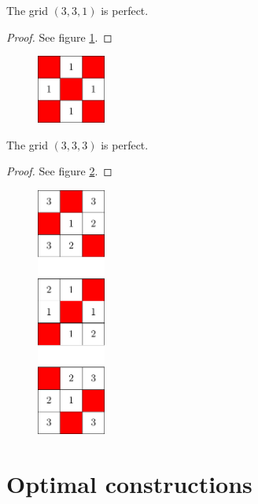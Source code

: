 \begin{con}
\label{con:3x3x1}
The grid $(3,3,1)$ is perfect.
\end{con}

\begin{proof}
See figure \ref{fig:3x3x1_numbered_heatmap}.
\end{proof}

\begin{figure}[]
\centering
\includegraphics[width=0.2\textwidth]{figures/A/3x3x1_numbered_heatmap.pdf}
\caption{}
\label{fig:3x3x1_numbered_heatmap}
\end{figure}

\begin{con}
\label{con:3x3x3}
The grid $(3,3,3)$ is perfect.
\end{con}

\begin{proof}
See figure \ref{fig:3x3x3_numbered_heatmap}.
\end{proof}

\begin{figure}[]
\centering
\includegraphics[width=0.2\textwidth]{figures/A/3x3x3_numbered_heatmap.pdf}
\caption{}
\label{fig:3x3x3_numbered_heatmap}
\end{figure}

\section{Optimal constructions}




